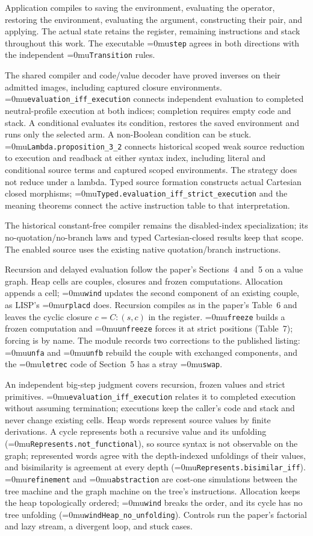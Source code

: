 \documentclass[11pt,a4paper]{article}
\newcommand{\name}[1]{\textup{\Urlmuskip=0mu\relax\nolinkurl{#1}}}
\begin{document}
Application compiles to saving the environment, evaluating the operator,
restoring the environment, evaluating the argument, constructing their pair,
and applying. The actual state retains the register, remaining instructions and
stack throughout this work. The executable \name{step} agrees in both
directions with the independent \name{Transition} rules.

The shared compiler and code/value decoder have proved inverses on their
admitted images, including captured closure environments.
\name{evaluation_iff_execution} connects independent evaluation to completed
neutral-profile execution at both indices; completion requires empty code
and stack. A conditional evaluates its condition, restores the saved environment
and runs only the selected arm. A non-Boolean condition can be stuck.
\name{Lambda.proposition_3_2} connects historical scoped weak source reduction
to execution and readback at either syntax index, including literal and
conditional source terms and captured scoped environments. The strategy does
not reduce under a lambda.
Typed source formation constructs actual Cartesian closed morphisms;
\name{Typed.evaluation_iff_strict_execution} and the meaning theorems connect
the active instruction table to that interpretation.

The historical constant-free compiler remains the disabled-index specialization;
its no-quotation/no-branch laws and typed Cartesian-closed results keep that
scope. The enabled source uses the existing native quotation/branch instructions.

Recursion and delayed evaluation follow the paper's Sections~4 and~5 on a value
graph. Heap cells are couples, closures and frozen computations. Allocation
appends a cell; \name{wind} updates the second component of an existing couple,
as LISP's \name{rplacd} does. Recursion compiles as in the paper's Table~6 and
leaves the cyclic closure $c = C{:}(s,c)$ in the register. \name{freeze} builds a
frozen computation and \name{unfreeze} forces it at strict positions (Table~7);
forcing is by name. The module records two corrections to the published listing:
\name{unfa} and \name{unfb} rebuild the couple with exchanged components, and the
\name{letrec} code of Section~5 has a stray \name{swap}.

An independent big-step judgment covers recursion, frozen values and strict
primitives. \name{evaluation_iff_execution} relates it to completed execution
without assuming termination; executions keep the caller's code and stack and never
change existing cells. Heap words represent source values by finite derivations.
A cycle represents both a recursive value and its unfolding
(\name{Represents.not_functional}), so source syntax is not observable on the graph;
represented words agree with the depth-indexed unfoldings of their values, and
bisimilarity is agreement at every depth (\name{Represents.bisimilar_iff}).
\name{refinement} and \name{abstraction} are cost-one simulations between the tree
machine and the graph machine on the tree's instructions. Allocation keeps the heap
topologically ordered; \name{wind} breaks the order, and its cycle has no tree
unfolding (\name{windHeap_no_unfolding}). Controls run the paper's factorial and
lazy stream, a divergent loop, and stuck cases.
\end{document}
